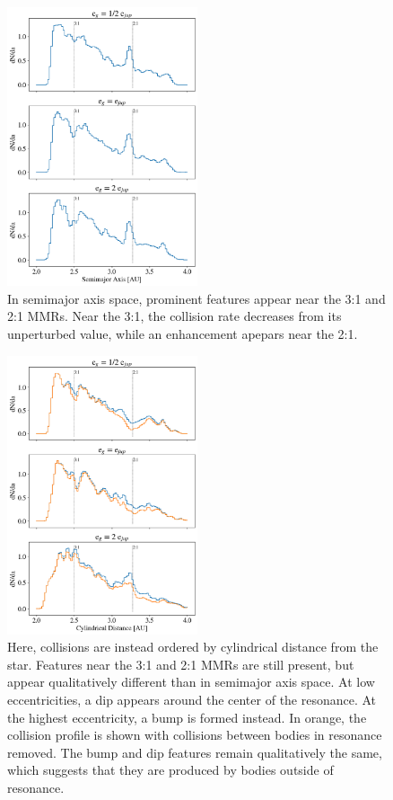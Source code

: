 \documentclass[twocolumn]{aastex63}
\begin{document}
\begin{figure}
\begin{center}
    \includegraphics[width=0.5\textwidth]{figures/coll_hist_a.png}
    \caption{In semimajor axis space, prominent features appear near the 3:1 and 2:1 MMRs. Near the 3:1, the collision
    rate decreases from its unperturbed value, while an enhancement apepars near the 2:1.\label{fig:coll_hist_a}}
\end{center}
\end{figure}

\begin{figure}
\begin{center}
    \includegraphics[width=0.5\textwidth]{figures/coll_hist_r.png}
    \caption{Here, collisions are instead ordered by cylindrical distance from the star. Features near the 3:1 and 2:1 MMRs are still present, but appear qualitatively different than in semimajor axis space. At low eccentricities, a dip appears around the center of the resonance. At the highest eccentricity, a bump is formed instead. In orange, the collision profile is shown with collisions between bodies in resonance removed. The bump and dip features remain qualitatively the same, which suggests that they are produced by bodies outside of resonance.\label{fig:coll_hist_r}}
\end{center}
\end{figure}
\end{document}
